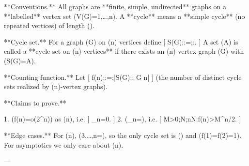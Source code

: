 **Conventions.**
All graphs are **finite, simple, undirected** graphs on a **labelled** vertex set (V(G)={1,\dots,n}).
A **cycle** means a **simple cycle** (no repeated vertices) of length (\ell{}).

**Cycle set.** For a graph (G) on (n) vertices define
[
S(G);:=;{\ell{}:}.
]
A set (A) is called a **cycle set on (n) vertices** if there exists an (n)-vertex graph (G) with (S(G)=A).

**Counting function.** Let
[
f(n);:=;\bigl|{S(G):; G n}\bigr|
]
(the number of distinct cycle sets realized by (n)-vertex graphs).

**Claims to prove.**

1. (f(n)=o(2^n)) as (n\to\infty), i.e.
   [
   \lim_{n\to\infty}=0.
   ]
2. (\displaystyle \lim_{n\to\infty}=\infty), i.e.
   [
   \forall M>0;\exists N;\forall n\ge N:\quad f(n)>M^{n/2}.
   ]

**Edge cases.** For (n), ({3,\dots,n}=\emptyset), so the only cycle set is (\emptyset) and (f(1)=f(2)=1). For asymptotics we only care about (n\to\infty).

---
